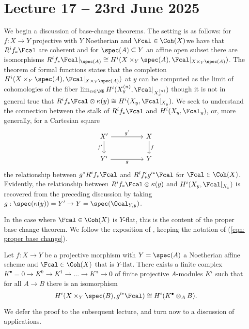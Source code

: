 \section{Lecture 17 -- 23rd June 2025}\label{sec: lecture 17}
We begin a discussion of base-change theorems. The setting is as follows: for $f:X\to Y$ projective with $Y$ Noetherian and $\Fcal\in\Coh(X)$we have that $R^{i}f_{*}\Fcal$ are coherent and for $\spec(A)\subseteq Y$ an affine open subset there are isomorphisms $R^{i}f_{*}\Fcal|_{\spec(A)}\cong H^{i}(X\times_{Y}\spec(A),\Fcal|_{X\times_{Y}\spec(A)})$. The theorem of formal functions  states that the completion $H^{i}(X\times_{Y}\spec(A),\Fcal|_{X\times_{Y}\spec(A)})$ at $y$ can be computed as the limit of cohomologies of the fiber $\lim_{n\in\NN}H^{i}(X_{y}^{(n)},\Fcal|_{X_{y}^{(n)}})$ though it is not in general true that $R^{i}f_{*}\Fcal\otimes\kappa(y)\cong H^{i}(X_{y},\Fcal|_{X_{y}})$. We seek to understand the connection between the stalk of $R^{i}f_{*}\Fcal$ and $H^{i}(X_{y},\Fcal_{y})$, or, more generally, for a Cartesian square 
\begin{equation}\label{eqn: proper base change}
    \begin{tikzcd}
        {X'} && X \\
        {Y'} && Y
        \arrow["{g'}", from=1-1, to=1-3]
        \arrow["{f'}"', from=1-1, to=2-1]
        \arrow["f", from=1-3, to=2-3]
        \arrow["g"', from=2-1, to=2-3]
    \end{tikzcd}
\end{equation}
the relationship between $g^{*}R^{i}f_{*}\Fcal$ and $R^{i}f'_{*}g'^{*}\Fcal$ for $\Fcal\in\Coh(X)$. Evidently, the relationship between $R^{i}f_{*}\Fcal\otimes\kappa(y)$ and $H^{i}(X_{y},\Fcal|_{X_{y}})$ is recovered from the preceding discussion by taking $g:\spec(\kappa(y))=Y'\to Y=\spec(\Ocal_{Y,y})$. 

In the case where $\Fcal\in\Coh(X)$ is $Y$-flat, this is the content of the proper base change theorem. We follow the exposition of \cite[p. 46]{Mumford}, keeping the notation of (\ref{eqn: proper base change}).
\begin{theorem}\label{thm: proper base change}
    Let $f:X\to Y$ be a projective morphism with $Y=\spec(A)$ a Noetherian affine scheme and $\Fcal\in\Coh(X)$ that is $Y$-flat. There exists a finite complex $K^{\bullet}=0\to K^{0}\to K^{1}\to\dots\to K^{n}\to0$ of finite projective $A$-modules $K^{i}$ such that for all $A\to B$ there is an isomorphism 
    $$H^{i}(X\times_{Y}\spec(B),g'^{*}\Fcal)\cong H^{i}(K^{\bullet}\otimes_{A}B).$$
\end{theorem}
We defer the proof to the subsequent lecture, and turn now to a discussion of applications. 

